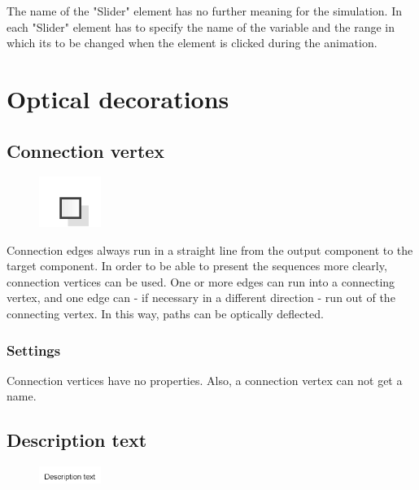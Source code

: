 The name of the "Slider" element has no further meaning for the simulation.
In each "Slider" element has to specify the name of the variable and the
range in which its to be changed when the element is clicked during the
animation.





\chapter{Optical decorations}

\section{Connection vertex}
\label{ref:ModelElementVertex}

\begin{figure}
\vspace{-22pt}
\includegraphics[width=2cm]{imageModelElementVertex.png}
\vspace{-22pt}
\end{figure}

Connection edges always run in a straight line from the output component
to the target component. In order to be able to present the sequences more clearly, connection vertices can be used.
One or more edges can run into a connecting vertex, and one edge can - if necessary in a different direction - run out
of the connecting vertex. In this way, paths can be optically deflected.

\subsection*{Settings}

Connection vertices have no properties. Also, a connection vertex can not get a name.


\section{Description text}
\label{ref:ModelElementText}

\begin{figure}
\vspace{-22pt}
\includegraphics[width=2cm]{imageModelElementText.png}
\vspace{-22pt}
\end{figure}

